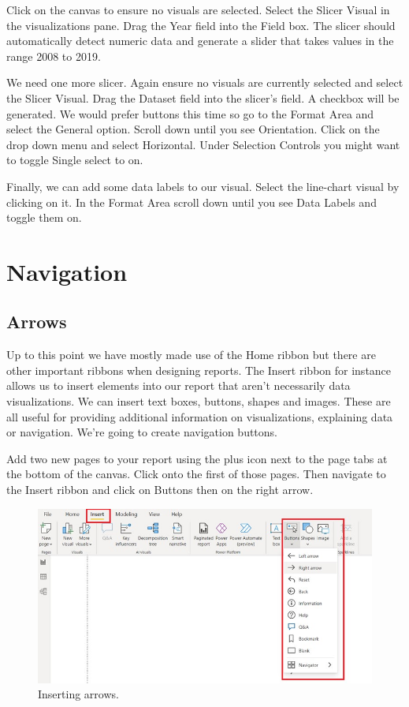 \documentclass[
]{book}
\begin{document}
Click on the canvas to ensure no visuals are selected. Select the Slicer Visual in the visualizations pane. Drag the Year field into the Field box. The slicer should automatically detect numeric data and generate a slider that takes values in the range 2008 to 2019.

We need one more slicer. Again ensure no visuals are currently selected and select the Slicer Visual. Drag the Dataset field into the slicer's field. A checkbox will be generated. We would prefer buttons this time so go to the Format Area and select the General option. Scroll down until you see Orientation. Click on the drop down menu and select Horizontal. Under Selection Controls you might want to toggle Single select to on.

Finally, we can add some data labels to our visual. Select the line-chart visual by clicking on it. In the Format Area scroll down until you see Data Labels and toggle them on.

\hypertarget{navigation}{%
\section{Navigation}\label{navigation}}

\hypertarget{arrows}{%
\subsection{Arrows}\label{arrows}}

Up to this point we have mostly made use of the Home ribbon but there are other important ribbons when designing reports. The Insert ribbon for instance allows us to insert elements into our report that aren't necessarily data visualizations. We can insert text boxes, buttons, shapes and images. These are all useful for providing additional information on visualizations, explaining data or navigation. We're going to create navigation buttons.

Add two new pages to your report using the plus icon next to the page tabs at the bottom of the canvas. Click onto the first of those pages. Then navigate to the Insert ribbon and click on Buttons then on the right arrow.

\begin{figure}
\centering
\includegraphics{bi11.jpg}
\caption{Inserting arrows.}
\end{figure}
\end{document}
